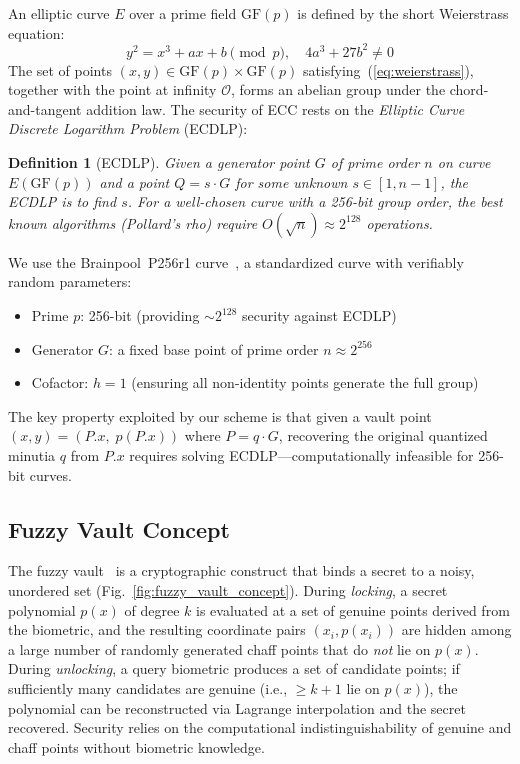\documentclass[3p,twocolumn]{elsarticle}
\newtheorem{definition}{Definition}
\newcommand{\GFp}{\mathrm{GF}(p)}
\begin{document}
An elliptic curve $E$ over a prime field $\GFp{}$ is defined by the short Weierstrass equation:
\begin{equation}
    y^2 = x^3 + ax + b \pmod{p}, \quad 4a^3 + 27b^2 \neq 0
    \label{eq:weierstrass}
\end{equation}
The set of points $(x, y) \in \GFp{} \times \GFp{}$ satisfying~(\ref{eq:weierstrass}), together with the point at infinity $\mathcal{O}$, forms an abelian group under the chord-and-tangent addition law. The security of ECC rests on the \emph{Elliptic Curve Discrete Logarithm Problem} (ECDLP):

\begin{definition}[ECDLP]
Given a generator point $G$ of prime order $n$ on curve $E(\GFp{})$ and a point $Q = s \cdot G$ for some unknown $s \in [1, n{-}1]$, the ECDLP is to find $s$. For a well-chosen curve with a 256-bit group order, the best known algorithms (Pollard's rho) require $O(\sqrt{n}) \approx 2^{128}$ operations.
\end{definition}

We use the Brainpool~P256r1 curve~\cite{rfc5639}, a standardized curve with verifiably random parameters:
\begin{itemize}
    \item Prime $p$: 256-bit (providing $\sim\!2^{128}$ security against ECDLP)
    \item Generator $G$: a fixed base point of prime order $n \approx 2^{256}$
    \item Cofactor: $h = 1$ (ensuring all non-identity points generate the full group)
\end{itemize}

\noindent The key property exploited by our scheme is that given a vault point $(x, y) = (P.x, \; p(P.x))$ where $P = q \cdot G$, recovering the original quantized minutia $q$ from $P.x$ requires solving ECDLP---computationally infeasible for 256-bit curves.

\subsection{Fuzzy Vault Concept}
\label{sec:fuzzy_vault_concept}

The fuzzy vault~\cite{juels2002fuzzy} is a cryptographic construct that binds a secret to a noisy, unordered set (Fig.~\ref{fig:fuzzy_vault_concept}). During \emph{locking}, a secret polynomial $p(x)$ of degree $k$ is evaluated at a set of genuine points derived from the biometric, and the resulting coordinate pairs $(x_i, p(x_i))$ are hidden among a large number of randomly generated chaff points that do \emph{not} lie on $p(x)$. During \emph{unlocking}, a query biometric produces a set of candidate points; if sufficiently many candidates are genuine (i.e., $\geq k+1$ lie on $p(x)$), the polynomial can be reconstructed via Lagrange interpolation and the secret recovered. Security relies on the computational indistinguishability of genuine and chaff points without biometric knowledge.
\end{document}
